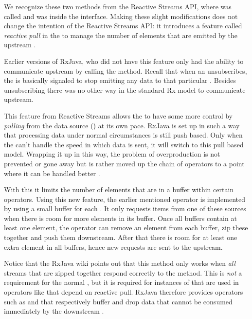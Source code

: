 We recognize these two methods from the Reactive Streams API, where  was called  and  was inside the  interface. Making these slight modifications does not change the intention of the Reactive Streams API: it introduces a feature called \textit{reactive pull} in the \obv to manage the number of elements that are emitted by the upstream \obs.

Earlier versions of RxJava, who did not have this feature only had the ability to communicate upstream by calling the  method. Recall that when an \obv unsubscribes, the \obs is basically signaled to stop emitting any data to that particular \obv. Besides unsubscribing there was no other way in the standard Rx model to communicate upstream.

This feature from Reactive Streams allows the \obv to have some more control by \emph{pulling} from the data source (\obs) at its own pace. RxJava is set up in such a way that processing data under normal circumstances is still push based. Only when the \obv can't handle the speed in which data is sent, it will switch to this pull based model. Wrapping it up in this way, the problem of overproduction is not prevented or gone away but is rather moved up the chain of operators to a point where it can be handled better \cite{RxJava-Wiki-Backpressure}.

With this it limits the number of elements that are in a buffer within certain operators. Using this new feature, the earlier mentioned  operator is implemented by using a small buffer for each \obs. It only requests items from one of these sources when there is room for more elements in its buffer. Once all buffers contain at least one element, the operator can remove an element from each buffer, zip these together and push them downstream. After that there is room for at least one extra element in all buffers, hence new requests are sent to the upstream.

Notice that the RxJava wiki \cite{RxJava-Wiki-Backpressure} points out that this method only works when \emph{all} streams that are zipped together respond correctly to the  method. This is \emph{not} a requirement for the normal \obs, but it is required for instances of \obs that are used in operators like  that depend on reactive pull. RxJava therefore provides operators such as  and  that respectively buffer and drop data that cannot be consumed immediately by the downstream \obv.
